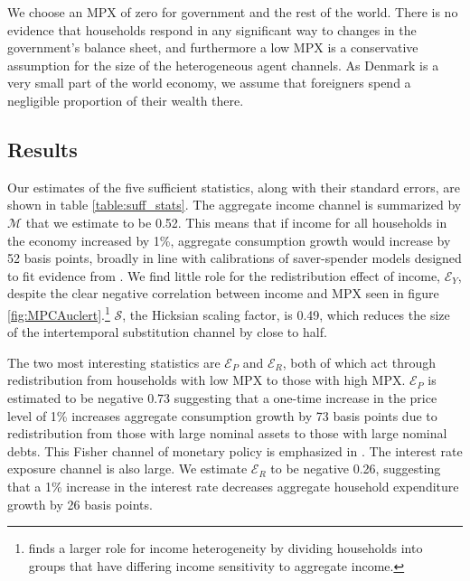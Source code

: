\documentclass[titlepage]{\econtex}\newcommand{\texname}{ConsumptionHeterogeneity}
\begin{document}
	We choose an MPX of zero for government and the rest of the world. There is no evidence that households respond in any significant way to changes in the government's balance sheet, and furthermore a low MPX is a conservative assumption for the size of the heterogeneous agent channels. As Denmark is a very small part of the world economy, we assume that foreigners spend a negligible proportion of their wealth there.
	
	\subsection{Results}
	Our estimates of the five sufficient statistics, along with their standard errors, are shown in table \ref{table:suff_stats}. The aggregate income channel is summarized by $\mathcal{M}$ that we estimate to be 0.52. This means that if income for all households in the economy increased by 1\%, aggregate consumption growth would increase by 52 basis points, broadly in line with calibrations of saver-spender models designed to fit evidence from \cite{campbell_consumption_1989}. We find little role for the redistribution effect of income, $\mathcal{E}_Y$, despite the clear negative correlation between income and MPX seen in figure \ref{fig:MPCAuclert}.\footnote{\cite{patterson_2019} finds a larger role for income heterogeneity by dividing households into groups that have differing income sensitivity to aggregate income.} $\mathcal{S}$, the Hicksian scaling factor, is 0.49, which reduces the size of the intertemporal substitution channel by close to half.
	
	The two most interesting statistics are $\mathcal{E}_P$ and $\mathcal{E}_R$, both of which act through redistribution from households with low MPX to those with high MPX. $\mathcal{E}_P$ is estimated to be  negative 0.73 suggesting that a one-time increase in the price level of 1\% increases aggregate consumption growth by 73 basis points due to redistribution from those with large nominal assets to those with large nominal debts. This Fisher channel of monetary policy is emphasized in \cite{doepke_inflation_2006}. The interest rate exposure channel is also large. We estimate  $\mathcal{E}_R$ to be  negative 0.26, suggesting that a 1\% increase in the interest rate decreases aggregate household expenditure growth by 26 basis points.
	
\end{document}
